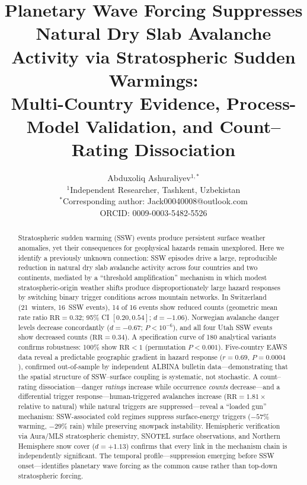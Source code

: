 \documentclass[11pt,letterpaper]{article}
\title{\textbf{Planetary Wave Forcing Suppresses Natural Dry Slab Avalanche Activity via Stratospheric Sudden Warmings:\\
Multi-Country Evidence, Process-Model Validation, and Count--Rating Dissociation}}
\author{
    Abduxoliq Ashuraliyev$^{1,*}$
    \\[6pt]
    $^1$Independent Researcher, Tashkent, Uzbekistan\\[6pt]
    $^*$Corresponding author: Jack00040008@outlook.com\\[6pt]
    ORCID: 0009-0003-5482-5526
}
\date{}
\begin{document}
\maketitle
\thispagestyle{empty}

\begin{abstract}
Stratospheric sudden warming (SSW) events produce persistent surface weather anomalies, yet their consequences for geophysical hazards remain unexplored.
Here we identify a previously unknown connection: SSW episodes drive a large, reproducible reduction in natural dry slab avalanche activity across four countries and two continents, mediated by a ``threshold amplification'' mechanism in which modest stratospheric-origin weather shifts produce disproportionately large hazard responses by switching binary trigger conditions across mountain networks.
In Switzerland (21~winters, 16~SSW events), 14 of 16 events show reduced counts (geometric mean rate ratio $\mathrm{RR} = 0.32$; 95\% CI $[0.20, 0.54]$; $d = -1.06$).
Norwegian avalanche danger levels decrease concordantly ($d = -0.67$; $P < 10^{-6}$), and all four Utah SSW events show decreased counts ($\mathrm{RR} = 0.34$).
A specification curve of 180 analytical variants confirms robustness: 100\% show $\mathrm{RR} < 1$ (permutation $P < 0.001$).
Five-country EAWS data reveal a predictable geographic gradient in hazard response ($r = 0.69$, $P = 0.0004$), confirmed out-of-sample by independent ALBINA bulletin data---demonstrating that the spatial structure of SSW--surface coupling is systematic, not stochastic.
A count--rating dissociation---danger \emph{ratings} increase while occurrence \emph{counts} decrease---and a differential trigger response---human-triggered avalanches increase ($\mathrm{RR} = 1.81\times$ relative to natural) while natural triggers are suppressed---reveal a ``loaded gun'' mechanism: SSW-associated cold regimes suppress surface-energy triggers ($-57\%$ warming, $-29\%$ rain) while preserving snowpack instability.
Hemispheric verification via Aura/MLS stratospheric chemistry, SNOTEL surface observations, and Northern Hemisphere snow cover ($d = +1.13$) confirms that every link in the mechanism chain is independently significant.
The temporal profile---suppression emerging before SSW onset---identifies planetary wave forcing as the common cause rather than top-down stratospheric forcing.
\end{abstract}
\end{document}
